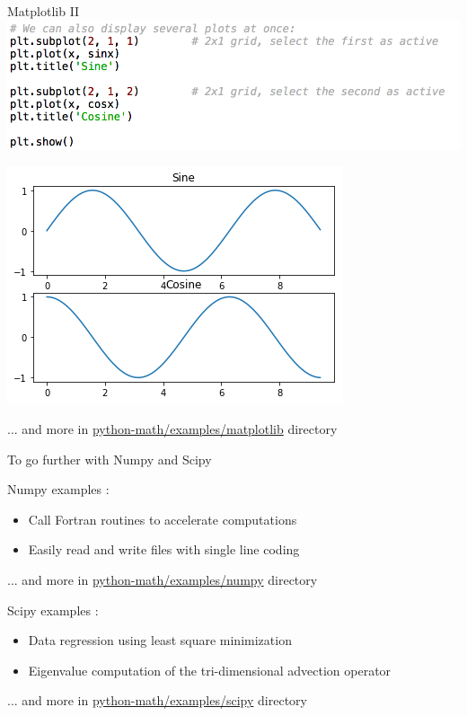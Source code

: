 \documentclass[11pt,unknownkeysallowed,usenames,dvipsnames]{beamer}
\begin{document}
\begin{frame}{Matplotlib II}
	\includegraphics[width=0.9\linewidth]{code-matplotlib2}
	
	\centering    \includegraphics[width=0.4\linewidth]{plot2}
    
    ... and more in    
    \href{https://gitlab.unige.ch/Thibaut.Lunet/python-math/tree/master/examples/matplotlib}{python-math/examples/matplotlib} directory
\end{frame}

\begin{frame}{To go further with Numpy and Scipy}
	\small
	\vspace{5pt}
	\begin{block}{Numpy examples :}
		\begin{itemize}
			\item Call Fortran routines to accelerate computations
			\item Easily read and write files with single line coding
		\end{itemize}
	\end{block}
	\vspace*{-7pt}
	... and more in    
	\href{https://gitlab.unige.ch/Thibaut.Lunet/python-math/tree/master/examples/numpy}{python-math/examples/numpy} directory
	\vspace*{6pt}
	\begin{block}{Scipy examples :}
		\begin{itemize}
			\item Data regression using least square minimization
			\item Eigenvalue computation of the tri-dimensional advection operator
		\end{itemize}
	\end{block}
	\vspace*{-7pt}
	... and more in    
	\href{https://gitlab.unige.ch/Thibaut.Lunet/python-math/tree/master/examples/scipy}{python-math/examples/scipy} directory \\
\end{frame}
\end{document}
